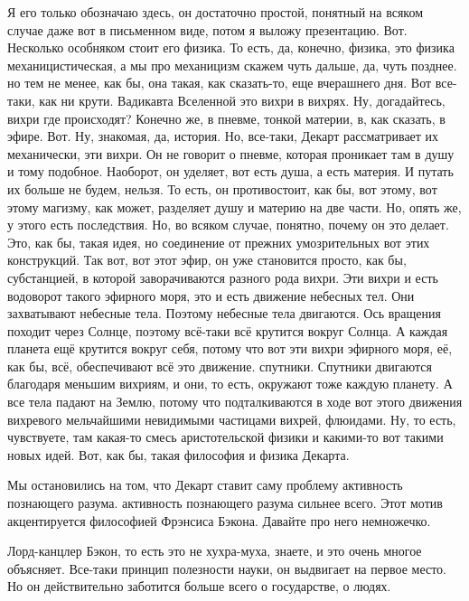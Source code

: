 Я его только обозначаю здесь, он достаточно простой, понятный на всяком случае
даже вот в письменном виде, потом я выложу презентацию. Вот. Несколько особняком
стоит его физика. То есть, да, конечно, физика, это физика механицистическая, а
мы про механицизм скажем чуть дальше, да, чуть позднее. но тем не менее, как бы,
она такая, как сказать-то, еще вчерашнего дня. Вот все-таки, как ни крути.
Вадикавта Вселенной это вихри в вихрях. Ну, догадайтесь, вихри где происходят?
Конечно же, в пневме, тонкой материи, в, как сказать, в эфире. Вот. Ну,
знакомая, да, история. Но, все-таки, Декарт рассматривает их механически, эти
вихри. Он не говорит о пневме, которая проникает там в душу и тому подобное.
Наоборот, он уделяет, вот есть душа, а есть материя. И путать их больше не
будем, нельзя. То есть, он противостоит, как бы, вот этому, вот этому магизму,
как может, разделяет душу и материю на две части. Но, опять же, у этого есть
последствия. Но, во всяком случае, понятно, почему он это делает. Это, как бы,
такая идея, но соединение от прежних умозрительных вот этих конструкций. Так
вот, вот этот эфир, он уже становится просто, как бы, субстанцией, в которой
заворачиваются разного рода вихри. Эти вихри и есть водоворот такого эфирного
моря, это и есть движение небесных тел. Они захватывают небесные тела. Поэтому
небесные тела двигаются. Ось вращения походит через Солнце, поэтому всё-таки всё
крутится вокруг Солнца. А каждая планета ещё крутится вокруг себя, потому что
вот эти вихри эфирного моря, её, как бы, всё, обеспечивают всё это движение.
спутники. Спутники двигаются благодаря меньшим вихриям, и они, то есть, окружают
тоже каждую планету. А все тела падают на Землю, потому что подталкиваются в
ходе вот этого движения вихревого мельчайшими невидимыми частицами вихрей,
флюидами. Ну, то есть, чувствуете, там какая-то смесь аристотельской физики и
какими-то вот такими новых идей. Вот, как бы, такая философия и физика Декарта.


Мы остановились на том, что Декарт ставит саму проблему активность познающего
разума.  активность познающего разума
сильнее всего. Этот мотив акцентируется философией Фрэнсиса Бэкона. Давайте про
него немножечко. 

Лорд-канцлер Бэкон, то есть это не хухра-муха, знаете, и
это очень многое объясняет. Все-таки принцип полезности науки, он выдвигает на
первое место. Но он действительно заботится больше всего о государстве, о людях.


